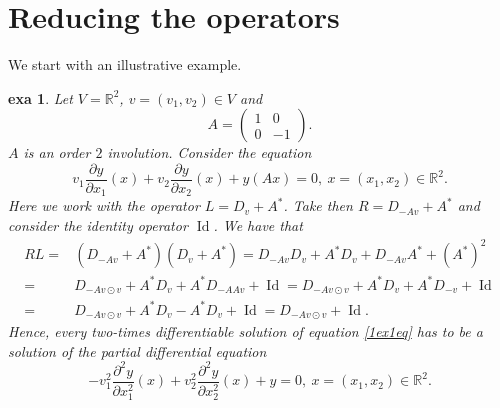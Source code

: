 \documentclass[a4paper,12pt,onecolumn]{article}
\theoremstyle{ptheorem}
\theoremstyle{hdef}
\theoremstyle{premark}
\newtheorem{exa}[thm]{exa}
\numberwithin{equation}{section}
\numberwithin{figure}{section}
\DeclareMathOperator{\Id}{Id}
\newcommand{\bC}{{\mathbb C}}
\newcommand{\bN}{{\mathbb N}}
\newcommand{\bR}{{\mathbb R}}
\newcommand{\<}{\langle}
\renewcommand{\>}{\rangle}
\renewcommand{\<}{\left<}
\renewcommand{\>}{\right>}
\renewcommand{\(}{\left(}
\renewcommand{\)}{\right)}
\begin{document}
\section{Reducing the operators}
We start with an illustrative example.
\begin{exa}\label{simplex}
Let $V=\bR^2$, $v=(v_1,v_2)\in V$ and
\[A=\begin{pmatrix}1 & 0  \\ 0 & -1\end{pmatrix}.\]
$A$ is an order $2$ involution. Consider the equation
\begin{equation}\label{1ex1eq}v_1\frac{\partial y}{\partial x_1}(x)+v_2\frac{\partial y}{\partial x_2}(x)+ y(Ax)=0,\ x=(x_1,x_2)\in\bR^2.\end{equation}
Here we work with the operator $L=D_v+A^*$. Take then $R=D_{-Av}+A^*$ and consider the identity operator $\Id$. We have that
\begin{align*} RL = & (D_{-Av}+A^*)(D_v+A^*)=D_{-Av}D_v+A^*D_v+D_{-Av}A^*+(A^*)^2 \\ = & D_{-Av\odot v}+A^*D_v+A^*D_{-AAv}+\Id =  D_{-Av\odot v}+A^*D_{v}+A^*D_{-v}+\Id \\ = & D_{-Av\odot v}+A^*D_v-A^*D_{v}+\Id = D_{-Av\odot v}+\Id.\end{align*}
Hence, every two-times differentiable solution of equation \eqref{1ex1eq} has to be a solution of the partial differential equation
\begin{equation*}-v_1^2\frac{\partial^2 y}{\partial x_1^2}(x)+v_2^2\frac{\partial^2 y}{\partial x_2^2}(x)+y=0,\ x=(x_1,x_2)\in\bR^2.\end{equation*}
\end{exa}
\end{document}
